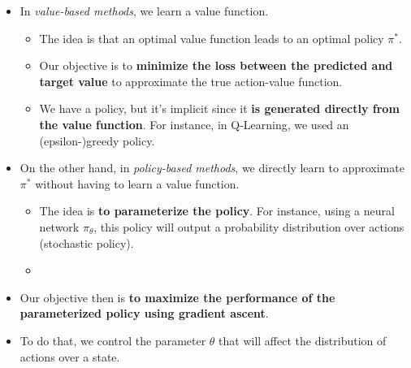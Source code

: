 \documentclass[11pt,a4paper]{article}
\begin{document}
\begin{itemize}
\tightlist
\item
  In \emph{value-based methods}, we learn a value function.

  \begin{itemize}
  \tightlist
  \item
    The idea is that an optimal value function leads to an optimal policy \(\pi^{*}\).
  \item
    Our objective is to \textbf{minimize the loss between the predicted and target value} to approximate the true action-value function.
  \item
    We have a policy, but it's implicit since it \textbf{is generated directly from the value function}. For instance, in Q-Learning, we used an (epsilon-)greedy policy.
  \end{itemize}
\item
  On the other hand, in \emph{policy-based methods}, we directly learn to approximate \(\pi^{*}\) without having to learn a value function.

  \begin{itemize}
  \tightlist
  \item
    The idea is \textbf{to parameterize the policy}. For instance, using a neural network \(\pi_\theta\), this policy will output a probability distribution over actions (stochastic policy).
  \item
  \end{itemize}
\end{itemize}


\begin{itemize}
\tightlist
\item
  Our objective then is \textbf{to maximize the performance of the parameterized policy using gradient ascent}.
\item
  To do that, we control the parameter \(\theta\) that will affect the distribution of actions over a state.
\end{itemize}

\end{document}
